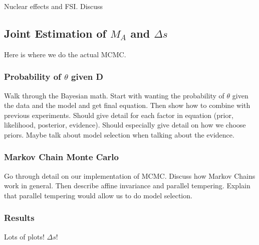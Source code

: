   \subsubsection{}
    Nuclear effects and FSI. Discuss 



\subsection{Joint Estimation of $M_A$ and $\Delta s$}\label{deltas}
  Here is where we do the actual MCMC.
  \subsubsection{Probability of $\theta$ given D}
    Walk through the Bayesian math. Start with wanting the probability of
    $\theta$ given the data and the model and get final equation. Then show how
    to combine with previous experiments. Should give detail for each factor in
    equation (prior, likelihood, posterior, evidence). Should especially give
    detail on how we choose priors. Maybe talk about model selection when
    talking about the evidence.
  \subsubsection{Markov Chain Monte Carlo}
    Go through detail on our implementation of MCMC. Discuss how Markov Chains
    work in general. Then describe affine invariance and parallel tempering.
    Explain that parallel tempering would allow us to do model selection.
  \subsubsection{Results}
    Lots of plots! $\Delta s$!


